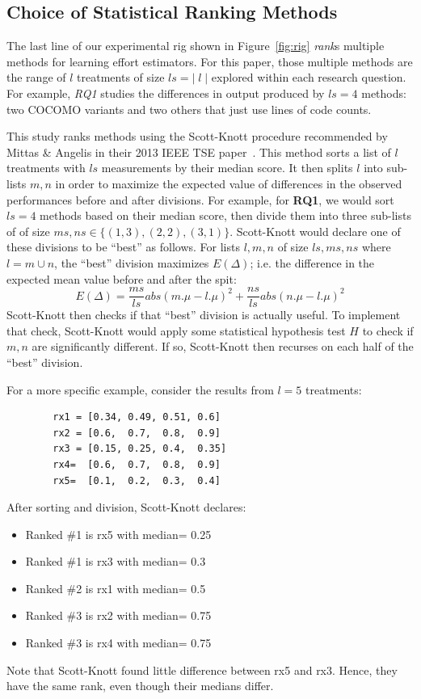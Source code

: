 \documentclass[smallcondesed]{svjour3}
\newcommand{\bi}{\begin{itemize}[leftmargin=0.4cm]}
\newcommand{\ei}{\end{itemize}}
\newcommand{\fig}[1]{Figure~\ref{fig:#1}}
\begin{document}
\subsection{Choice of Statistical Ranking Methods}\label{sect:stats}
The last line of our experimental rig shown in
\fig{rig} {\em rank}s multiple methods for learning
effort estimators.
For this paper, those multiple methods
are the range of $l$ treatments of size
$\mathit{ls}=|\;l\;|$ explored within
each research question. For example, {\em RQ1}
studies the differences in output produced by $\mathit{ls}=4$ methods: two COCOMO variants and two others
that just use lines of code counts.

This study ranks methods using the Scott-Knott
procedure recommended by Mittas \& Angelis in their 2013
IEEE TSE paper~\cite{mittas13}.  This method
sorts a list of $l$ treatments with $\mathit{ls}$ measurements by their median
score. It then
splits $l$ into sub-lists $m,n$ in order to maximize the expected value of
 differences  in the observed performances
before and after divisions. For example,
for {\bf RQ1}, we would sort $\mathit{ls}=4$ 
methods based on their median score,
then divide them into three sub-lists of of size $\mathit{ms},\mathit{ns} \in \{(1,3), (2,2), (3,1)\}$.
Scott-Knott would declare one of these divisions
to be ``best'' as follows.
For lists $l,m,n$ of size $\mathit{ls},\mathit{ms},\mathit{ns}$ where $l=m\cup n$, the ``best'' division maximizes $E(\Delta)$; i.e.
the difference in the expected mean value
before and after the spit: 
 \[E(\Delta)=\frac{ms}{ls}abs(m.\mu - l.\mu)^2 + \frac{ns}{ls}abs(n.\mu - l.\mu)^2\]
Scott-Knott then checks if that
``best'' division is actually useful.
To implement that check, Scott-Knott would
apply some statistical hypothesis test $H$ to check
if $m,n$ are significantly different. If so, Scott-Knott then recurses on each half of the ``best'' division.

For a more specific example, consider the results
from $l=5$ treatments:

{\small \begin{verbatim}
        rx1 = [0.34, 0.49, 0.51, 0.6]
        rx2 = [0.6,  0.7,  0.8,  0.9]
        rx3 = [0.15, 0.25, 0.4,  0.35]
        rx4=  [0.6,  0.7,  0.8,  0.9]
        rx5=  [0.1,  0.2,  0.3,  0.4]
\end{verbatim}}
\noindent
After sorting and division, Scott-Knott declares:
\bi
\item Ranked \#1 is rx5 with median= 0.25
\item Ranked \#1 is rx3 with median= 0.3
\item Ranked \#2 is rx1 with median= 0.5
\item Ranked \#3 is rx2 with median= 0.75
\item Ranked \#3 is rx4 with median= 0.75
\ei
Note that Scott-Knott found  little
difference between rx5 and rx3. Hence,
they have the same rank, even though their medians differ.
\end{document}

